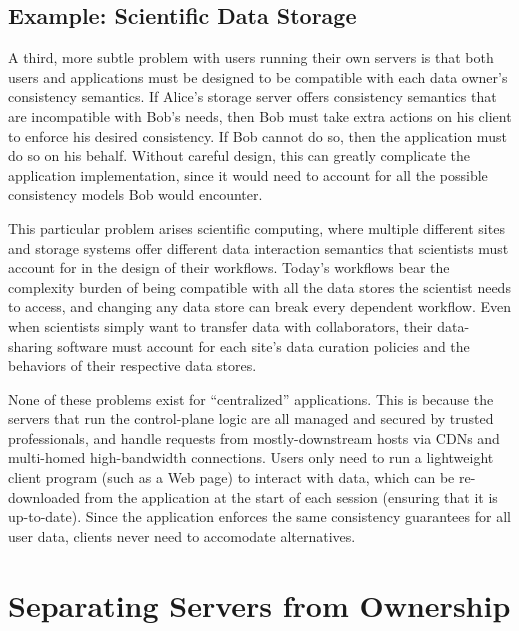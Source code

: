 
\subsection{Example: Scientific Data Storage}

A third, more subtle problem with users running their own servers is that 
both users and applications must be designed to be compatible with each data
owner's consistency semantics.  If Alice's storage server offers consistency
semantics that are incompatible with Bob's needs, then Bob must take extra actions
on his client to enforce his desired consistency.
If Bob cannot do so, then the application
must do so on his behalf.  Without careful design, this can greatly complicate
the application implementation, since it would need to account for all the
possible consistency models Bob would encounter.

This particular problem arises scientific computing, where multiple different sites and
storage systems offer different data interaction semantics that scientists
must account for in the design of their workflows.  Today's workflows bear the
complexity burden of being compatible with all the data stores the scientist
needs to access, and changing any data store can break every dependent workflow.
Even when scientists simply want to transfer data with collaborators, their
data-sharing software must account for each site's data curation policies and
the behaviors of their respective data stores.

None of these problems exist for ``centralized''
applications.  This is because the servers that run the control-plane logic
are all managed and secured by trusted professionals, and handle requests from
mostly-downstream hosts via CDNs and multi-homed high-bandwidth connections.
Users only need to run a lightweight client program (such as a Web page)
to interact with data, which can be re-downloaded from the application at the
start of each session (ensuring that it is up-to-date).  Since the application
enforces the same consistency guarantees for all user data, clients never need
to accomodate alternatives.

\section{Separating Servers from Ownership}

